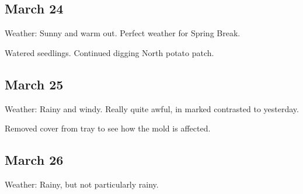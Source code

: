 \documentclass{article}
\begin{document}
\subsection*{March 24}
Weather: Sunny and warm out. Perfect weather for Spring Break.

Watered seedlings. Continued digging North potato patch.

\subsection*{March 25}
Weather: Rainy and windy. Really quite awful, in marked contrasted to yesterday.

Removed cover from tray to see how the mold is affected.

\subsection*{March 26}
Weather: Rainy, but not particularly rainy.
\end{document}
